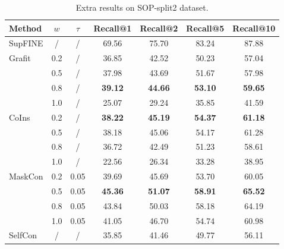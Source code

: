 \documentclass[10pt,twocolumn,letterpaper]{article}
\begin{document}
\begin{table}[htbp]
\centering
\begin{tabular}{@{}l|c|c|cccc@{}}
\toprule
Method                  & $w$ & $\tau$ & Recall@1       & Recall@2       & Recall@5       & Recall@10      \\ \midrule
SupFINE                 & /   & /      & 69.56          & 75.70          & 83.24          & 87.88          \\ \midrule
\multirow{4}{*}{Grafit} & 0.2 & /      & 36.85          & 42.52          & 50.23          & 57.04          \\
                        & 0.5 & /      & 37.98          & 43.69          & 51.67          & 57.98          \\
                        & 0.8 & /      & \textbf{39.12} & \textbf{44.66} & \textbf{53.10} & \textbf{59.65} \\
                        & 1.0 & /      & 25.07          & 29.24          & 35.85          & 41.59          \\ \midrule
\multirow{4}{*}{CoIns}  & 0.2 & /      & \textbf{38.22} & \textbf{45.19} & \textbf{54.37} & \textbf{61.18} \\
                        & 0.5 & /      & 38.18          & 45.06          & 54.17          & 61.28          \\
                        & 0.8 & /      & 36.72          & 42.49          & 51.23          & 58.61          \\
                        & 1.0 & /      & 22.56          & 26.34          & 33.28          & 38.95          \\ \midrule
MaskCon                 & 0.2 & 0.05   & 39.69          & 45.69          & 53.70          & 60.05          \\
                        & 0.5 & 0.05   & \textbf{45.36} & \textbf{51.07} & \textbf{58.91} & \textbf{65.52} \\
                        & 0.8 & 0.05   & 43.84          & 50.03          & 58.18          & 64.19          \\
                        & 1.0 & 0.05   & 41.05          & 46.70          & 54.74          & 60.98          \\ \midrule
SelfCon                 & /   & /      & 35.85          & 41.46          & 49.77          & 56.11          \\ \bottomrule
\end{tabular}
\caption{Extra results on SOP-split2 dataset.}
\label{tab:sop-split2}
\end{table}
\end{document}
